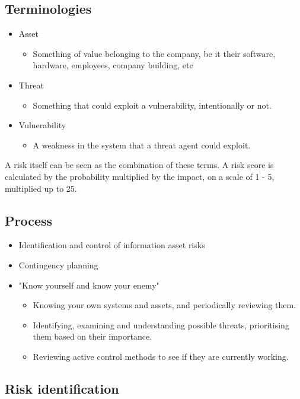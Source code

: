 \documentclass[12pt]{report}
\begin{document}
\subsection{Terminologies}
	\begin{itemize}
		\item Asset
		\begin{itemize}
			\item Something of value belonging to the company, be it their software, hardware, employees, company building, etc
		\end{itemize}
		\item Threat
		\begin{itemize}
			\item Something that could exploit a vulnerability, intentionally or not.
		\end{itemize}
		\item Vulnerability
		\begin{itemize}
			\item A weakness in the system that a threat agent could exploit.
		\end{itemize}
	\end{itemize}

\noindent A risk itself can be seen as the combination of these terms. A risk score is calculated by the probability multiplied by the impact,
on a scale of 1 - 5, multiplied up to 25.

\subsection{Process}
\begin{itemize}
	\item Identification and control of information asset risks
	\item Contingency planning
	\item "Know yourself and know your enemy"
	\begin{itemize}
		\item Knowing your own systems and assets, and periodically reviewing them.
		\item Identifying, examining and understanding possible threats, prioritising them based on their importance.
		\item Reviewing active control methods to see if they are currently working.
	\end{itemize}
\end{itemize}
\subsection{Risk identification}
\end{document}
